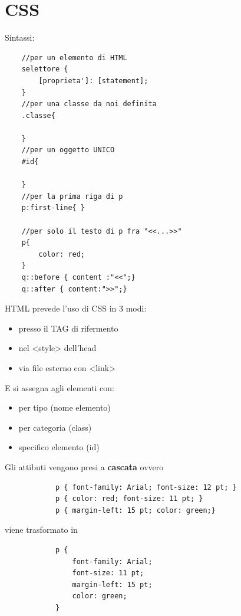\documentclass[a4paper,12pt]{article}
\begin{document}
\section{CSS}
Sintassi:
\begin{lstlisting}
    //per un elemento di HTML
    selettore { 
        [proprieta']: [statement];
    }
    //per una classe da noi definita
    .classe{

    }
    //per un oggetto UNICO
    #id{

    }
    //per la prima riga di p
    p:first-line{ }

    //per solo il testo di p fra "<<...>>"
    p{
        color: red;
    }
    q::before { content :"<<";}
    q::after { content:">>";}
\end{lstlisting}
HTML prevede l'uso di CSS in 3 modi:
\begin{itemize}
    \item presso il TAG di rifermento
    \item nel <style> dell'head
    \item via file esterno con <link>
\end{itemize}
E si assegna agli elementi con:
\begin{itemize}
    \item per tipo (nome elemento)
    \item per categoria (class)
    \item specifico elemento (id)
\end{itemize}
Gli attibuti vengono presi a \textbf{cascata} ovvero
\begin{center}
    \begin{lstlisting}
            p { font-family: Arial; font-size: 12 pt; }
            p { color: red; font-size: 11 pt; }
            p { margin-left: 15 pt; color: green;}
    \end{lstlisting} 
    viene trasformato in \\
    \begin{lstlisting}
            p {
                font-family: Arial;
                font-size: 11 pt;
                margin-left: 15 pt;
                color: green;
            }
    \end{lstlisting}
\end{center}
\end{document}
